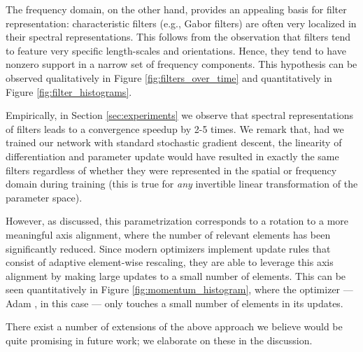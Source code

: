 \documentclass{article} %
\begin{document}
The frequency domain, on the other hand, provides an appealing basis for filter representation: characteristic filters (e.g., Gabor filters) are often very localized in their spectral representations. This follows from the observation that filters tend to feature very specific length-scales and orientations. Hence, they tend to have nonzero support in a narrow set of frequency components. This hypothesis can be observed qualitatively in Figure \ref{fig:filters_over_time} and quantitatively in Figure \ref{fig:filter_histograms}.

Empirically, in Section \ref{sec:experiments} we observe that spectral representations of filters leads to a convergence speedup by 2-5 times. We remark that, had we trained our network with standard stochastic gradient descent, the linearity of differentiation and parameter update would have resulted in exactly the same filters regardless of whether they were represented in the spatial or frequency domain during training (this is true for \emph{any} invertible linear transformation of the parameter space).

However, as discussed, this parametrization corresponds to a rotation to a more meaningful axis alignment, where the number of relevant elements has been significantly reduced. Since modern optimizers implement update rules that consist of adaptive element-wise rescaling, they are able to leverage this axis alignment by making large updates to a small number of elements. This can be seen quantitatively in Figure \ref{fig:momentum_histogram}, where the optimizer --- Adam \citep{adam2015}, in this case --- only touches a small number of elements in its updates.

There exist a number of extensions of the above approach we believe would be quite promising in future work; we elaborate on these in the discussion.
\end{document}
